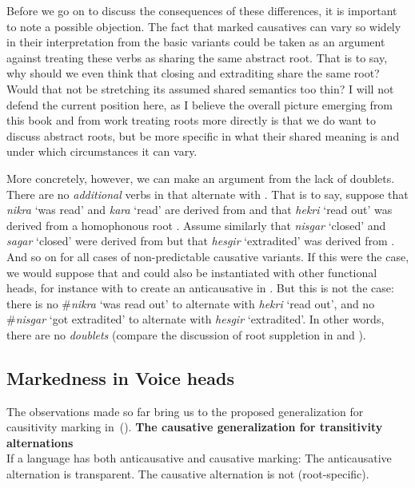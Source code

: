 Before we go on to discuss the consequences of these differences, it is important to note a possible objection. The fact that marked causatives can vary so widely in their interpretation from the basic variants could be taken as an argument against treating these verbs as sharing the same abstract root. That is to say, why should we even think that closing and extraditing share the same root? Would that not be stretching its assumed shared semantics too thin? I will not defend the current position here, as I believe the overall picture emerging from this book and from work treating roots more directly is that we do want to discuss abstract roots, but be more specific in what their shared meaning is and under which circumstances it can vary.

More concretely, however, we can make an argument from the lack of doublets. There are no \emph{additional} verbs in {\tnif} that alternate with {\thif}. That is to say, suppose that \emph{nikra} `was read' and \emph{kara} `read' are derived from  and that \emph{hekri} `read out' was derived from a homophonous root . Assume similarly that \emph{nisgar} `closed' and \emph{sagar} `closed' were derived from  but that \emph{hesgir} `extradited' was derived from . And so on for all cases of non-predictable causative variants. If this were the case, we would suppose that  and  could also be instantiated with other functional heads, for instance with {\vz} to create an anticausative in {\tnif}. But this is not the case: there is no \#\emph{nikra} `was read out' to alternate with \emph{hekri} `read out', and no \#\emph{nisgar} `got extradited' to alternate with \emph{hesgir} `extradited'. In other words, there are no \emph{doublets} (compare the discussion of root suppletion in \citealt{harley14thlia,harley14thlib,harley15roots} and \citealt{borer14thli}).

		\subsection{Markedness in Voice heads}
The observations made so far bring us to the proposed generalization for causitivity marking in~(\nextx).
\pex\label{ex:vd:causgen}\textbf{The causative generalization for transitivity alternations}\\
	If a language has both anticausative and causative marking:
	\a The anticausative alternation is transparent.
	\a The causative alternation is not (root-specific).
\xe

